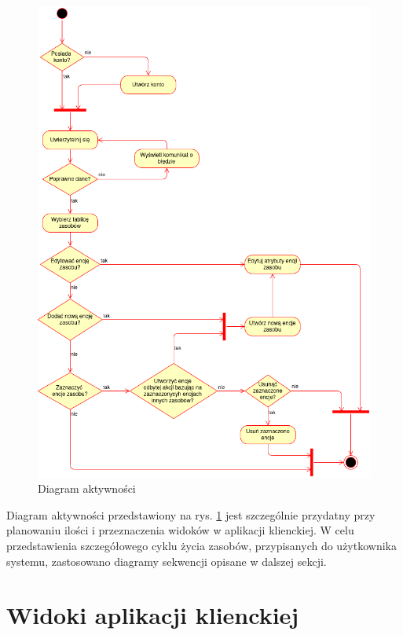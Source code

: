 \begin{figure}[!htbp]
    \centering
    \includegraphics[width=\textwidth]{img/chapter4/open-osp.uml-diagrams-activity.png}
    \caption{Diagram aktywności}
    \label{fig:uml.activity}
\end{figure}

Diagram aktywności przedstawiony na rys. \ref{fig:uml.activity} jest szczególnie przydatny przy planowaniu ilości i przeznaczenia widoków w aplikacji klienckiej. W celu przedstawienia szczegółowego cyklu życia zasobów, przypisanych do użytkownika systemu, zastosowano diagramy sekwencji opisane w dalszej sekcji.

\section{Widoki aplikacji klienckiej}

